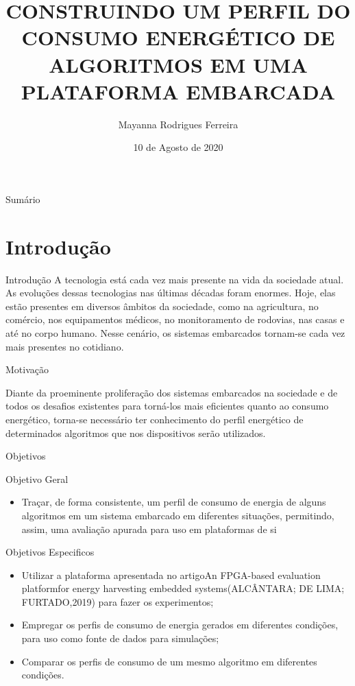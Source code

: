 \documentclass{IFES-beamer}
\title[Presentation Template]{CONSTRUINDO UM PERFIL DO CONSUMO ENERGÉTICO DE ALGORITMOS EM UMA PLATAFORMA EMBARCADA }
\author{Mayanna Rodrigues Ferreira}
\institute[IFCE]{
  Instituto Federal do Ceará\\
  Maracananu
}
\date{10 de Agosto de 2020}
\begin{document}
\begin{frame}
  \titlepage
\end{frame}

\begin{frame}{Sumário}
  \tableofcontents
\end{frame}

\section{Introdução}
\begin{frame}{Introdução}
A tecnologia está cada vez mais presente na vida da sociedade atual. As evoluções dessas tecnologias nas últimas décadas foram enormes. Hoje, elas estão presentes em diversos âmbitos da sociedade, como na agricultura, no comércio, nos equipamentos médicos, no monitoramento de rodovias, nas casas e até no corpo humano. Nesse cenário, os sistemas embarcados tornam-se cada vez mais presentes no cotidiano.

\end{frame}
\begin{frame}{Motivação}

Diante da proeminente proliferação dos sistemas embarcados na sociedade e de todos os desafios existentes para torná-los mais eficientes quanto ao consumo energético, torna-se necessário ter conhecimento do perfil energético de determinados algoritmos que nos dispositivos serão utilizados.

\end{frame}

\begin{frame}{Objetivos}
\begin{block}{Objetivo Geral}
\begin{itemize}
  \item Traçar, de forma consistente, um perfil de consumo de energia de alguns algoritmos em um sistema embarcado em diferentes situações, permitindo, assim, uma avaliação apurada para uso em plataformas de si
\end{itemize}
\end{block}

\begin{block}{Objetivos Especificos}
\begin{itemize}
  \item Utilizar a plataforma apresentada no artigoAn FPGA-based evaluation platformfor energy harvesting embedded systems(ALCÂNTARA; DE LIMA; FURTADO,2019) para fazer os experimentos;
  \item Empregar os perfis de consumo de energia gerados em diferentes condições, para uso como fonte de dados para simulações;
  \item Comparar os perfis de consumo de um mesmo algoritmo em diferentes condições.
\end{itemize}
\end{block}
\end{frame}
\end{document}
